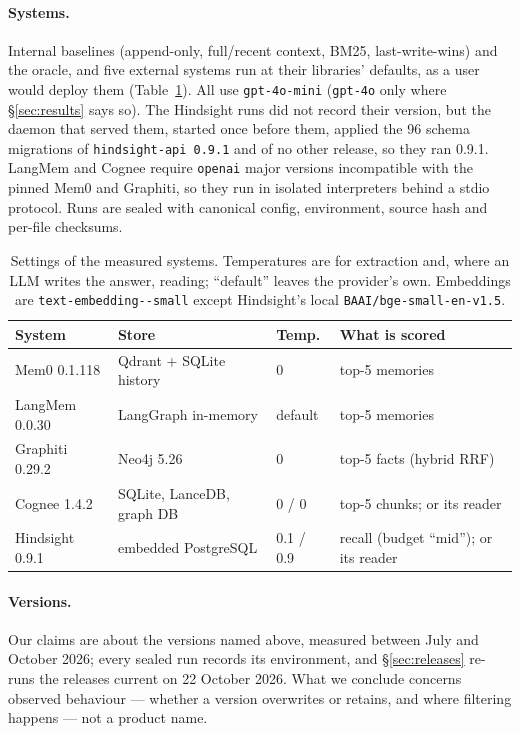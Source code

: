 \documentclass[conference]{IEEEtran}
\newcommand{\embedmodel}{\texttt{text-\allowbreak embedding-\allowbreak 3-\allowbreak small}}
\begin{document}
\paragraph{Systems.} Internal baselines (append-only, full/recent context, BM25,
last-write-wins) and the oracle, and five external systems run at their
libraries' defaults, as a user would deploy them (Table~\ref{tab:settings}).
All use \texttt{gpt-4o-mini} (\texttt{gpt-4o} only where \S\ref{sec:results}
says so). The Hindsight runs did not record their version, but the daemon that
served them, started once before them, applied the 96 schema migrations of
\texttt{hindsight-api 0.9.1} and of no other release, so they ran 0.9.1. LangMem and
Cognee require \texttt{openai} major versions incompatible with the pinned Mem0
and Graphiti, so they run in isolated interpreters behind a stdio protocol. Runs
are sealed with canonical config, environment, source hash and per-file
checksums.

\begin{table}[t]
\centering
\caption{Settings of the measured systems. Temperatures are for extraction and,
where an LLM writes the answer, reading; ``default'' leaves the provider's own.
Embeddings are \embedmodel{} except Hindsight's local
\texttt{BAAI/bge-small-en-v1.5}.}
\label{tab:settings}
\footnotesize
\setlength{\tabcolsep}{2.5pt}
\begin{tabular}{@{}l>{\raggedright\arraybackslash}p{2.25cm}l>{\raggedright\arraybackslash}p{2.45cm}@{}}
\toprule
System & Store & Temp. & What is scored \\
\midrule
Mem0 0.1.118      & Qdrant + SQLite history     & 0 & top-5 memories \\
LangMem 0.0.30    & LangGraph in-memory         & default & top-5 memories \\
Graphiti 0.29.2   & Neo4j 5.26                  & 0 & top-5 facts (hybrid RRF) \\
Cognee 1.4.2      & SQLite, LanceDB, graph DB   & 0 / 0 & top-5 chunks; or its reader \\
Hindsight 0.9.1   & embedded PostgreSQL         & 0.1 / 0.9 & recall (budget ``mid''); or its reader \\
\bottomrule
\end{tabular}
\end{table}

\paragraph{Versions.} Our claims are about the versions named above, measured
between July and October 2026; every sealed run records its environment, and
\S\ref{sec:releases} re-runs the releases current on 22 October 2026. What we
conclude concerns observed behaviour --- whether a version overwrites or
retains, and where filtering happens --- not a product name.
\end{document}
